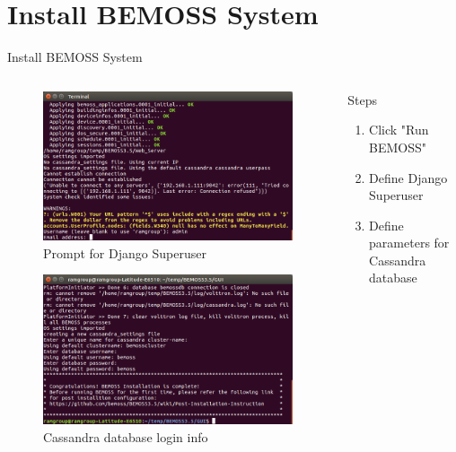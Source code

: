 \documentclass{beamer}
\begin{document}
\section{Install BEMOSS System}

\begin{frame}{Install BEMOSS System}
\begin{columns}[T]
	\begin{column}{0.5\textwidth}
		\begin{figure}
			\includegraphics[scale=0.15]{../figs/djangoSuperuser.png}
			\caption{Prompt for Django Superuser}
		\end{figure}
		\begin{figure}
			\includegraphics[scale=0.15]{../figs/bemossFinish.png}
			\caption{Cassandra database login info}
		\end{figure}
	\end{column}
	\begin{column}{0.5\textwidth}
		\begin{block}{Steps}
			\begin{enumerate}
				\item Click "Run BEMOSS"
				\item Define Django Superuser
				\item Define parameters for Cassandra database
			\end{enumerate}
		\end{block}
	\end{column}
\end{columns}
\end{frame}
\end{document}
